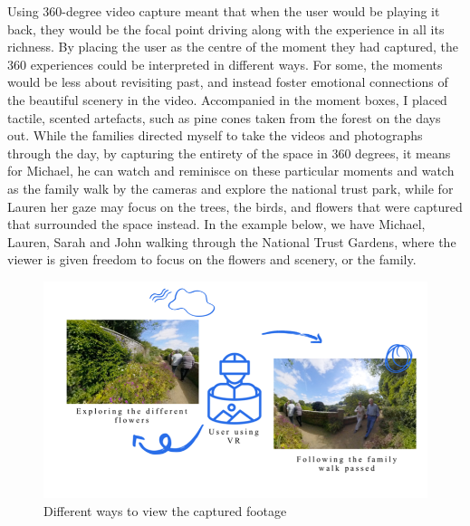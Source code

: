 Using 360-degree video capture meant that when the user would be playing it back, they would be the focal point driving along with the experience in all its richness. By placing the user as the centre of the moment they had captured, the 360 experiences could be interpreted in different ways. For some, the moments would be less about revisiting past, and instead foster emotional connections of the beautiful scenery in the video. Accompanied in the moment boxes, I placed tactile, scented artefacts, such as pine cones taken from the forest on the days out. While the families directed myself to take the videos and photographs through the day, by capturing the entirety of the space in 360 degrees, it means for Michael, he can watch and reminisce on these particular moments and watch as the family walk by the cameras and explore the national trust park, while for Lauren her gaze may focus on the trees, the birds, and flowers that were captured that surrounded the space instead. In the example below, we have Michael, Lauren, Sarah and John walking through the National Trust Gardens, where the viewer is given freedom to focus on the flowers and scenery, or the family.
 
\begin{figure}
\centering
\includegraphics[width=.8\linewidth]{Images/WaysToViewCapturedFootage.png}
\caption{Different ways to view the captured footage}
\label{fig:capturedFootage}
\end{figure}

